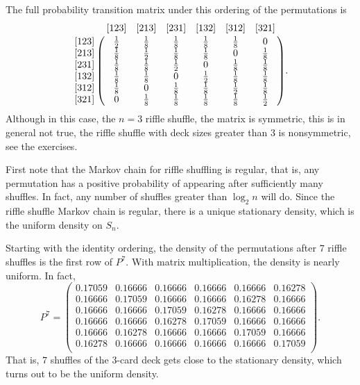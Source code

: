 \documentclass[12pt]{article}
\begin{document}
\begin{example}
    The full probability transition matrix under this ordering of the
    permutations is
    \[
        \bordermatrix{  & [123] & [213] & [231] & [132] & [312] & [321]
        \cr
        [123]   & \frac{1}{2}   & \frac{1}{8}   & \frac{1}{8}   & \frac{1}
        {8}     & \frac{1}{8}   & 0 \cr
        [213]   & \frac{1}{8}   & \frac{1}{2}   & \frac{1}{8}   & \frac{1}
        {8}     & 0     & \frac{1}{8} \cr
        [231]   & \frac{1}{8}   & \frac{1}{8}   & \frac{1}{2}   & 0
        & \frac{1}{8}   & \frac{1}{8} \cr
        [132]   & \frac{1}{8}   & \frac{1}{8}   & 0     & \frac{1}{2}
        & \frac{1}{8}   & \frac{1}{8} \cr
        [312]   & \frac{1}{8}   & 0     & \frac{1}{8}   & \frac{1}{8}
        & \frac{1}{2}   & \frac{1}{8} \cr
        [321]   & 0     & \frac{1}{8}   & \frac{1}{8}   & \frac{1}{8}
        & \frac{1}{8}   & \frac{1}{2} \cr
        }.
    \] Although in this case, the \( n=3 \) riffle shuffle, the matrix
    is symmetric, this is in general not true, the riffle shuffle with
    deck sizes greater than \( 3 \) is nonsymmetric, see the exercises.
\end{example}

First note that the Markov chain for riffle shuffling is regular, that
is, any permutation has a positive probability of appearing after
sufficiently many shuffles.  In fact, any number of shuffles greater
than \( \log_2 n \) will do. Since the riffle shuffle Markov chain is
regular, there is a unique stationary density, which is the uniform
density on \( S_n \).

Starting with the identity ordering, the density of the permutations
after \( 7 \) riffle shuffles is the first row of \( P^7 \).  With
matrix multiplication, the density is nearly uniform. In fact,
\[
    P^7 =
    \begin{pmatrix}
        0.17059 & 0.16666       & 0.16666       & 0.16666       &
        0.16666 & 0.16278 \\
        0.16666 & 0.17059       & 0.16666       & 0.16666       &
        0.16278 & 0.16666 \\
        0.16666 & 0.16666       & 0.17059       & 0.16278       &
        0.16666 & 0.16666 \\
        0.16666 & 0.16666       & 0.16278       & 0.17059       &
        0.16666 & 0.16666 \\
        0.16666 & 0.16278       & 0.16666       & 0.16666       &
        0.17059 & 0.16666 \\
        0.16278 & 0.16666       & 0.16666       & 0.16666       &
        0.16666 & 0.17059 \\
    \end{pmatrix}
    .
\] That is, \( 7 \) shuffles of the 3-card deck gets close to the
stationary density, which turns out to be the uniform density.
\end{document}

